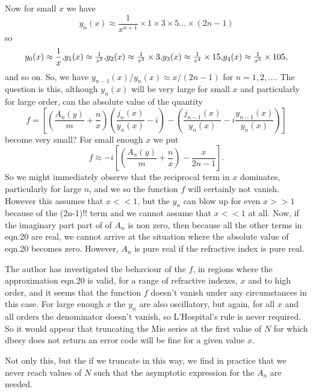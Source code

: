 \documentclass[12pt]{article}
\begin{document}
Now for small $x$ we have
\begin{equation}
y_n(x) \approx \frac{1}{x^{n+1}} \times 1 \times 3 \times 5 \ldots \times (2n-1)\end{equation}
so
\begin{equation}
y_0(x) \approx \frac{1}{x},
$$    $$
y_1(x) \approx \frac{1}{x^2},
$$   $$
y_2(x) \approx \frac{1}{x^3} \times 3,
$$    $$
y_3(x) \approx \frac{1}{x^4} \times 15,
$$   $$
y_4(x) \approx \frac{1}{x^5} \times 105, 
\end{equation}
and so on.
So, we have $y_{n-1}(x)/ y_n (x) \approx x/(2n-1)$ for $n=1,2,\ldots$.
The question is this, although $y_n(x)$ will be very large for small
$x$ and particularly  for large order, can the absolute value of
the quantity
\begin{equation}
  f=\left \lbrack \left ( 
\frac{A_n(y)}{m}+\frac{n}{x} 
\right )
 \left ( \frac{j_n(x)}{y_n(x)}-i \right )-
 \left (
\frac{j_{n-1}(x)}{y_n(x)}-i 
  \frac{y_{n-1}(x)}{y_n(x)} \right ) \right \rbrack
\end{equation}
become very small?
For small enough $x$ we put
\begin{equation}
  f \approx  -i
 \left  \lbrack 
 \left ( 
 \frac{A_n(y)}{m}+\frac{n}{x} 
 \right )
- \frac{x}{2n-1} 
   \right \rbrack.
\end{equation}
So we might immediately observe that the reciprocal term in $x$ 
dominates, particularly for large $n$, and we so the function 
$f$ will certainly not vanish. However this assumes that $x<<1$, but
the $y_n$ can blow up for even $x>>1$ because of the (2n-1)!! term
and we cannot assume that $x<< 1$ at all. Now, if the imaginary part
part of of $A_n$ is non zero, then because all the other terms in eqn.20
are real, we cannot arrive at the situation where the absolute value
of eqn.20 becomes zero. However,  $A_n$  is pure real if the refractive
 index is pure real.

 The author has investigated the behaviour of the
$f$, in regions where the approximation eqn.20 is valid, for a range of
refractive indexes, $x$ and to high order, and it seems that the function $f$ 
doesn't vanish under any circumstances in this case. 
For large enough $x$ the $y_n$ are also oscillatory, but again, for
all $x$ and all orders the denominator doesn't vanish, so L'Hospital's rule
is never required.
So it would appear that truncating the Mie series 
at the first value of $N$ for which dbesy does not return an error code will 
be fine for a given value $x$.

Not only this, but the if we truncate in this way, we find in practice that we never reach 
values of $N$ such that the asymptotic expression for the $A_n$ are needed.
\end{document}
